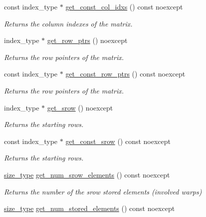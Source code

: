 \begin{DoxyCompactItemize}
const index\+\_\+type $\ast$ \hyperlink{classgko_1_1matrix_1_1Csr_ac9d640d26449e0ee46c7cb2b80100d65}{get\+\_\+const\+\_\+col\+\_\+idxs} () const noexcept
\begin{DoxyCompactList}\small\item\em Returns the column indexes of the matrix. \end{DoxyCompactList}\item 
index\+\_\+type $\ast$ \hyperlink{classgko_1_1matrix_1_1Csr_a068e5158cf282fa977f0a137f8cd7f03}{get\+\_\+row\+\_\+ptrs} () noexcept
\begin{DoxyCompactList}\small\item\em Returns the row pointers of the matrix. \end{DoxyCompactList}\item 
const index\+\_\+type $\ast$ \hyperlink{classgko_1_1matrix_1_1Csr_a50c9ce521649450d7ae5ff488e42c190}{get\+\_\+const\+\_\+row\+\_\+ptrs} () const noexcept
\begin{DoxyCompactList}\small\item\em Returns the row pointers of the matrix. \end{DoxyCompactList}\item 
index\+\_\+type $\ast$ \hyperlink{classgko_1_1matrix_1_1Csr_a919fb1efdcbde6fba7eb18bdc39ba46a}{get\+\_\+srow} () noexcept
\begin{DoxyCompactList}\small\item\em Returns the starting rows. \end{DoxyCompactList}\item 
const index\+\_\+type $\ast$ \hyperlink{classgko_1_1matrix_1_1Csr_ac046f27c47848bf31c9234567661ef48}{get\+\_\+const\+\_\+srow} () const noexcept
\begin{DoxyCompactList}\small\item\em Returns the starting rows. \end{DoxyCompactList}\item 
\hyperlink{namespacegko_a6e5c95df0ae4e47aab2f604a22d98ee7}{size\+\_\+type} \hyperlink{classgko_1_1matrix_1_1Csr_a5b8c25c2fb1bbea62a3afdec8f8340c5}{get\+\_\+num\+\_\+srow\+\_\+elements} () const noexcept
\begin{DoxyCompactList}\small\item\em Returns the number of the srow stored elements (involved warps) \end{DoxyCompactList}\item 
\hyperlink{namespacegko_a6e5c95df0ae4e47aab2f604a22d98ee7}{size\+\_\+type} \hyperlink{classgko_1_1matrix_1_1Csr_ab70c085fc3df11a4ed9fe74b40844c5c}{get\+\_\+num\+\_\+stored\+\_\+elements} () const noexcept

\end{DoxyCompactItemize}
